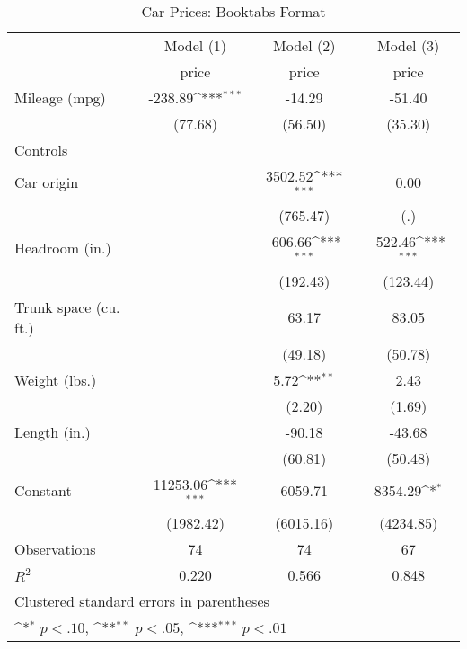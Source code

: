 \begin{table}[htbp]\centering
\def\sym#1{\ifmmode^{#1}\else\(^{#1}\)\fi}
\caption{Car Prices: Booktabs Format}
\begin{tabular}{l*{3}{c}}
\toprule
                    &\multicolumn{1}{c}{Model (1)}&\multicolumn{1}{c}{Model (2)}&\multicolumn{1}{c}{Model (3)}\\
                    &       price         &       price         &       price         \\
\midrule
Mileage (mpg)       &     -238.89\sym{***}&      -14.29         &      -51.40         \\
                    &     (77.68)         &     (56.50)         &     (35.30)         \\
Controls            &                     &                     &                     \\
Car origin          &                     &     3502.52\sym{***}&        0.00         \\
                    &                     &    (765.47)         &         (.)         \\
Headroom (in.)      &                     &     -606.66\sym{***}&     -522.46\sym{***}\\
                    &                     &    (192.43)         &    (123.44)         \\
Trunk space (cu. ft.)&                     &       63.17         &       83.05         \\
                    &                     &     (49.18)         &     (50.78)         \\
Weight (lbs.)       &                     &        5.72\sym{**} &        2.43         \\
                    &                     &      (2.20)         &      (1.69)         \\
Length (in.)        &                     &      -90.18         &      -43.68         \\
                    &                     &     (60.81)         &     (50.48)         \\
Constant            &    11253.06\sym{***}&     6059.71         &     8354.29\sym{*}  \\
                    &   (1982.42)         &   (6015.16)         &   (4234.85)         \\
\midrule
Observations        &          74         &          74         &          67         \\
\(R^{2}\)           &       0.220         &       0.566         &       0.848         \\
\bottomrule
\multicolumn{4}{l}{\footnotesize Clustered standard errors in parentheses}\\
\multicolumn{4}{l}{\footnotesize \sym{*} \(p<.10\), \sym{**} \(p<.05\), \sym{***} \(p<.01\)}\\
\end{tabular}
\end{table}
